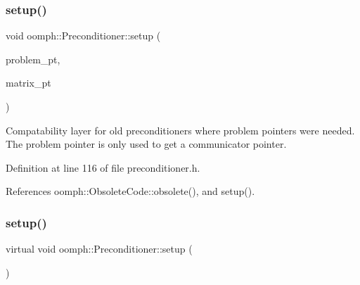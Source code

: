 \mbox{\label{classoomph_1_1Preconditioner_a783fae97e4b898f8de72b504a4f4bec6}} 
\subsubsection{\texorpdfstring{setup()}{setup()}\hspace{0.1cm}{\footnotesize\ttfamily [2/3]}}
{\footnotesize\ttfamily void oomph\+::\+Preconditioner\+::setup (\begin{DoxyParamCaption}\item[{const \hyperlink{classoomph_1_1Problem}{Problem} $\ast$}]{problem\+\_\+pt,  }\item[{\hyperlink{classoomph_1_1DoubleMatrixBase}{Double\+Matrix\+Base} $\ast$}]{matrix\+\_\+pt }\end{DoxyParamCaption})\hspace{0.3cm}{\ttfamily [inline]}}



Compatability layer for old preconditioners where problem pointers were needed. The problem pointer is only used to get a communicator pointer. 



Definition at line 116 of file preconditioner.\+h.



References oomph\+::\+Obsolete\+Code\+::obsolete(), and setup().

\mbox{\label{classoomph_1_1Preconditioner_af4886f4efe510e5c9b0eb19422943588}} 
\subsubsection{\texorpdfstring{setup()}{setup()}\hspace{0.1cm}{\footnotesize\ttfamily [3/3]}}
{\footnotesize\ttfamily virtual void oomph\+::\+Preconditioner\+::setup (\begin{DoxyParamCaption}{ }\end{DoxyParamCaption})\hspace{0.3cm}{\ttfamily [pure virtual]}}



